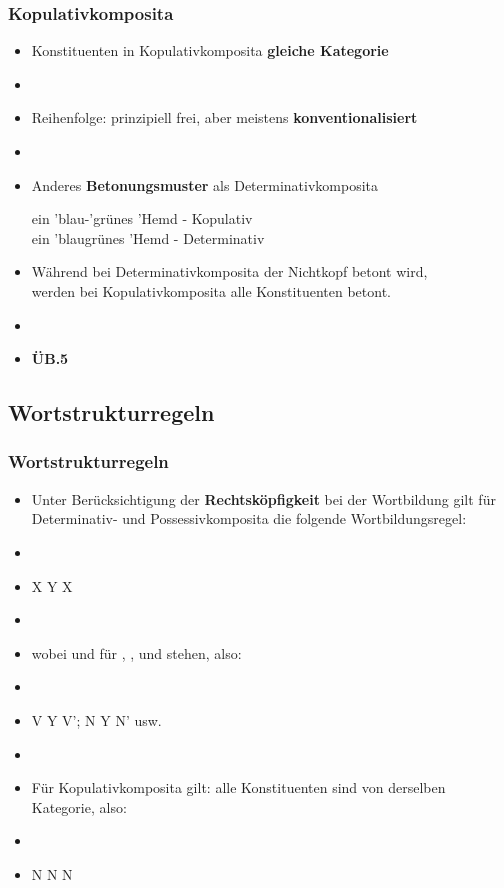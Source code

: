 \begin{frame}
\frametitle{Kopulativkomposita}

\begin{itemize}
	\item Konstituenten in Kopulativkomposita \ras \textbf{gleiche Kategorie}
	\item[]
	\item Reihenfolge: prinzipiell frei, aber meistens \textbf{konventionalisiert}
	\item[]
	\item Anderes \textbf{Betonungsmuster} als Determinativkomposita
	
	\ea ein 'blau-'grünes 'Hemd - Kopulativ \\
		 ein 'blaugrünes 'Hemd - Determinativ
	\z
		 
	\item Während bei Determinativkomposita der Nichtkopf betont wird,\\
              werden bei Kopulativkomposita alle Konstituenten betont.
	\item[]
	\item[] \textbf{ÜB.5}
\end{itemize}


\end{frame}


\subsection{Wortstrukturregeln}


\begin{frame}
\frametitle{Wortstrukturregeln}

\begin{itemize}
	\item Unter Berücksichtigung der \textbf{Rechtsköpfigkeit} bei der Wortbildung gilt für Determinativ- und Possessivkomposita die folgende Wortbildungsregel:
	\item[]
	\item X \ras Y X
	\item[]
	\item wobei  und  für , ,  und  stehen, also:
	\item[]
	\item V \ras Y V'; N \ras Y N' usw.
	\item 	
	\item Für Kopulativkomposita gilt: alle Konstituenten sind von derselben Kategorie, also:
	\item[]
	\item N \ras N N 
\end{itemize}


\end{frame}


